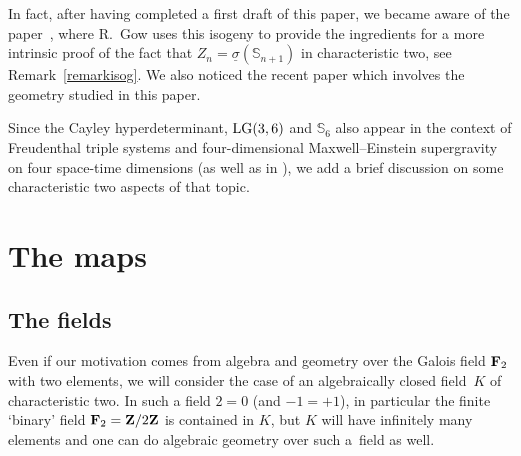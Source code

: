 \documentclass[pdftex]{sigma}
\newcommand{\ZZ}{{\bf Z}}
\newcommand{\FF}{{\bf F}}
\newcommand{\bS}{{\mathbb S}}
\numberwithin{equation}{section}
\begin{document}
In fact, after having completed a first draft of this paper, we became aware of the paper~\cite{Gow}, where R.~Gow uses this isogeny to provide the ingredients for a more intrinsic proof of the fact that $Z_n=\underline{\sigma}(\bS_{n+1})$ in characteristic two, see Remark~\ref{remarkisog}. We also noticed the recent paper \cite{LH} which involves the geometry studied in this paper.

Since the Cayley hyperdeterminant, ${\rm LG}(3,6)$ and $\bS_{6}$ also appear in the context of Freudenthal triple systems and four-dimensional Maxwell--Einstein supergravity on four space-time dimensions (as well as in \cite[Table~3]{Holweck}), we add a brief discussion on some characteristic two aspects of that topic.

\section{The maps}

\subsection{The fields}
Even if our motivation comes from algebra and geometry over the Galois field $\FF_2$ with two elements, we will consider the case of an algebraically closed field~$K$ of characteristic two. In such a field $2=0$ (and $-1=+1$), in particular the finite `binary' field $\FF_2=\ZZ/2\ZZ$ is contained in $K$, but $K$ will have infinitely many elements and one can do algebraic geometry over such a~field as well.
\end{document}
